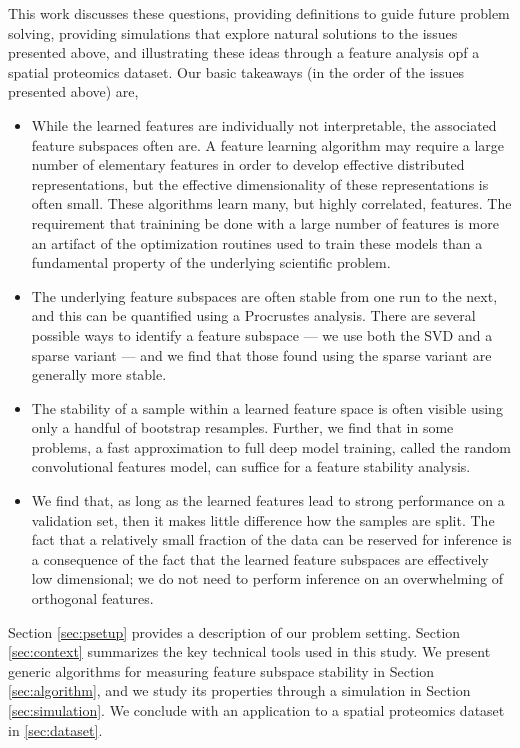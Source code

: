 This work discusses these questions, providing definitions to guide future
problem solving, providing simulations that explore natural solutions to the
issues presented above, and illustrating these ideas through a feature analysis
opf a spatial proteomics dataset. Our basic takeaways (in the order of the
issues presented above) are,

\begin{itemize}
\item While the learned features are individually not interpretable, the
  associated feature subspaces often are. A feature learning algorithm may
  require a large number of elementary features in order to develop effective
  distributed representations, but the effective dimensionality of these
  representations is often small. These algorithms learn many, but highly
  correlated, features. The requirement that trainining be done with a large
  number of features is more an artifact of the optimization routines used to
  train these models than a fundamental property of the underlying scientific
  problem.
\item The underlying feature subspaces are often stable from one run to the
  next, and this can be quantified using a Procrustes analysis. There are
  several possible ways to identify a feature subspace — we use both the SVD and
  a sparse variant — and we find that those found using the sparse variant are
  generally more stable.
\item The stability of a sample within a learned feature space is often visible
  using only a handful of bootstrap resamples. Further, we find that in some
  problems, a fast approximation to full deep model training, called the random
  convolutional features model, can suffice for a feature stability analysis.
\item We find that, as long as the learned features lead to strong performance
  on a validation set, then it makes little difference how the samples are
  split. The fact that a relatively small fraction of the data can be reserved
  for inference is a consequence of the fact that the learned feature subspaces
  are effectively low dimensional; we do not need to perform inference on an
  overwhelming of orthogonal features.
\end{itemize}

Section \ref{sec:psetup} provides a description of our problem setting. Section
\ref{sec:context} summarizes the key technical tools used in this study. We
present generic algorithms for measuring feature subspace stability in Section
\ref{sec:algorithm}, and we study its properties through a simulation in Section
\ref{sec:simulation}. We conclude with an application to a spatial proteomics
dataset in \ref{sec:dataset}.

